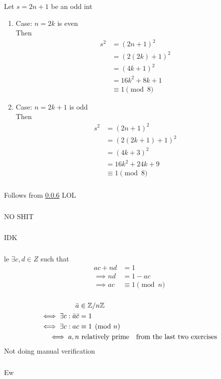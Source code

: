 \documentclass{article}
\begin{document}
\subsubsection{}
Let $s=2n+1$ be an odd int
\begin{enumerate}
\item Case: $n = 2k$ is even\\
Then
\begin{align*}
s^2 &= (2n+1)^2\\
&= (2(2k) + 1)^2\\
&= (4k + 1)^2\\
&= 16k^2 + 8k + 1\\
&\equiv 1 \pmod{8}
\end{align*}
\item Case: $n = 2k+1$ is odd\\
Then
\begin{align*}
s^2 &= (2n+1)^2\\
&= (2(2k+1) + 1)^2\\
&= (4k + 3)^2\\
&= 16k^2 + 24k + 9\\
&\equiv 1 \pmod{8}
\end{align*}
\end{enumerate}
\subsubsection{}
Follows from \ref{0p3p14} LOL
\subsubsection{}
NO SHIT 
\subsubsection{}
IDK
\subsubsection{}
le $\exists c,d \in Z$ such that
\begin{align*}
ac + nd &= 1\\
\implies nd &= 1-ac\\
\implies ac &\equiv 1 \pmod{n}
\end{align*}
\subsubsection{} \label{0p3p14}
\begin{align*}
\bar{a} &\in \mathbb{Z}/n\mathbb{Z}\\
\iff \exists c: \bar{a}\bar{c} &= 1\\
\iff \exists c: ac &\equiv 1 \pmod{n}\\
\iff a,n & \text{ relatively prime} & \text{from the last two exercises}
\end{align*}
Not doing manual verification
\subsubsection{}
Ew
\end{document}
